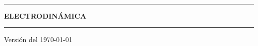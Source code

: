 \documentclass[letterpaper,11pt]{report}
\begin{document}
\sffamily

\thispagestyle{empty}
\begin{center}

\

\rule{14cm}{0.1cm}

\vspace{1.5cm}

{\huge \textsc{\textbf{ELECTRODINÁMICA}}}

\vspace{1.5cm}

\rule{14cm}{0.1cm}

\vspace{1.0cm}

Versión del \today

\end{center}

\tableofcontents
{}
\setcounter{page}{1}


\newpage

\newpage

\newpage

\newpage

\newpage

\newpage
\appendix

\newpage

\newpage

\end{document}
